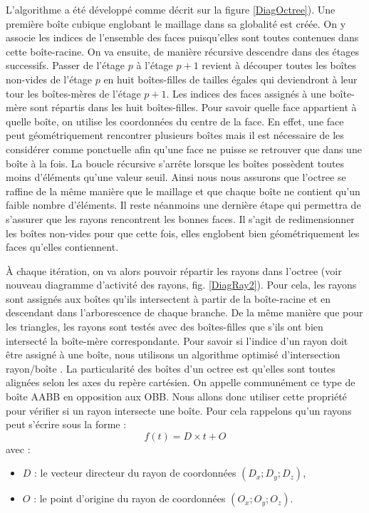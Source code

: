 L'algorithme a été développé comme décrit sur la figure \ref{DiagOctree}). Une première boîte cubique englobant le maillage dans sa globalité est créée. On y associe les indices de l'ensemble des faces puisqu'elles sont toutes contenues dans cette boîte-racine. On va ensuite, de manière récursive descendre dans des étages successifs. Passer de l'étage $p$ à l'étage $p+1$ revient à découper toutes les boîtes non-vides de l'étage $p$ en huit boîtes-filles de tailles égales qui deviendront à leur tour les boîtes-mères de l'étage $p+1$. Les indices des faces assignés à une boîte-mère sont répartis dans les huit boîtes-filles. Pour savoir quelle face appartient à quelle boîte, on utilise les coordonnées du centre de la face. En effet, une face peut géométriquement rencontrer plusieurs boîtes mais il est nécessaire de les considérer comme ponctuelle afin qu'une face ne puisse se retrouver que dans une boîte à la fois. La boucle récursive s'arrête lorsque les boîtes possèdent toutes moins d'éléments qu'une valeur seuil. Ainsi nous nous assurons que l'\gls{octree} se raffine de la même manière que le maillage et que chaque boîte ne contient qu'un faible nombre d'éléments. Il reste néanmoins une dernière étape qui permettra de s'assurer que les rayons rencontrent les bonnes faces. Il s'agit de redimensionner les boîtes non-vides pour que cette fois, elles englobent bien géométriquement les faces qu'elles contiennent.


À chaque itération, on va alors pouvoir répartir les rayons dans l'\gls{octree} (voir nouveau diagramme d'activité des rayons, fig. \ref{DiagRay2}). Pour cela, les rayons sont assignés aux boîtes qu'ils intersectent à partir de la boîte-racine et en descendant dans l'arborescence de chaque branche. De la même manière que pour les triangles, les rayons sont testés avec des boîtes-filles que s'ils ont bien intersecté la boîte-mère correspondante. Pour savoir si l'indice d'un rayon doit être assigné à une boîte, nous utilisons un algorithme optimisé d'intersection rayon/boîte \cite{AABB}. La particularité des boîtes d'un \gls{octree} est qu'elles sont toutes alignées selon les axes du repère cartésien. On appelle communément ce type de boîte \gls{AABB} en opposition aux \gls{OBB}. Nous allons donc utiliser cette propriété pour vérifier si un rayon intersecte une boîte. Pour cela rappelons qu'un rayons peut s'écrire sous la forme : 
\begin{equation}
f(t) = D \times t + O
\end{equation}
avec :
\begin{itemize}
\item $D$ : le vecteur directeur du rayon de coordonnées $(D_x ; D_y ; D_z)$,
\item $O$ : le point d'origine du rayon de coordonnées $(O_x ; O_y ; O_z)$.
\end{itemize}

